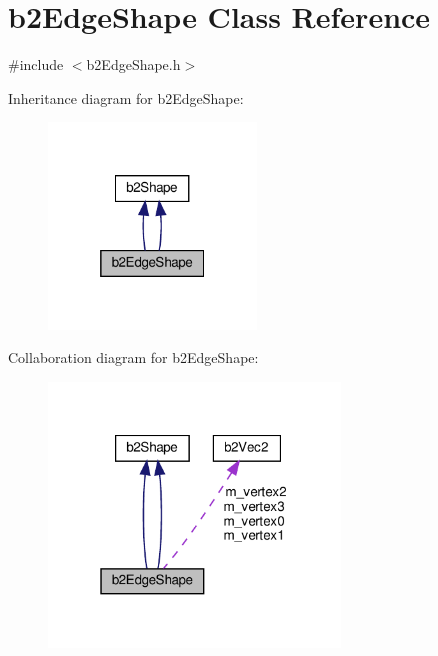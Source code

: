 \hypertarget{classb2EdgeShape}{}\section{b2\+Edge\+Shape Class Reference}
\label{classb2EdgeShape}


{\ttfamily \#include $<$b2\+Edge\+Shape.\+h$>$}



Inheritance diagram for b2\+Edge\+Shape\+:
\nopagebreak
\begin{figure}[H]
\begin{center}
\leavevmode
\includegraphics[width=157pt]{classb2EdgeShape__inherit__graph}
\end{center}
\end{figure}


Collaboration diagram for b2\+Edge\+Shape\+:
\nopagebreak
\begin{figure}[H]
\begin{center}
\leavevmode
\includegraphics[width=220pt]{classb2EdgeShape__coll__graph}
\end{center}
\end{figure}
